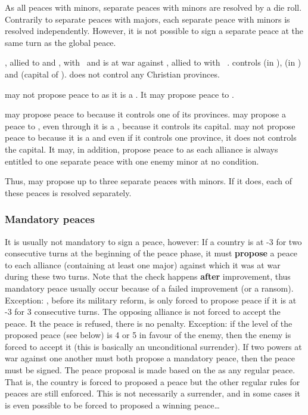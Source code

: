 \bparag As all peaces with minors, separate peaces with minors are resolved by
a die roll.
\bparag Contrarily to separate peaces with majors, each separate peace with
minors is resolved independently.
\bparag However, it is not possible to sign a separate peace at the same turn
as the global peace.

\begin{exemple}
  \TUR, allied to \paysMaroc and \paysTripoli, with \VASSAL\ \paysAlgerie and
  \paysTunisie is at war against \HIS, allied to \paysVenise with \VASSAL\
  \paysChevaliers. \HIS controls \provinceJebelTubqal (in \paysMaroc),
  \provinceOran (in \paysAlgerie) and \provinceIfriqiya (capital of
  \paysTunisie). \TUR does not control any Christian provinces.

  \TUR may not propose peace to \paysChevaliers as it is a \VASSAL. It may
  propose peace to \paysVenise.

  \HIS may propose peace to \paysMaroc because it controls one of its
  provinces. \HIS may propose a peace to \paysTunisie, even through it is a
  \VASSAL, because it controls its capital. \HIS may not propose peace to
  \paysAlgerie because it is a \VASSAL and even if it controls one province,
  it does not controls the capital. It may, in addition, propose peace to
  \paysTripoli as each alliance is always entitled to one separate peace with
  one enemy minor at no condition. 

  Thus, \HIS may propose up to three separate peaces with minors. If it does,
  each of these peaces is resolved separately.
\end{exemple}

\subsubsection{Mandatory peaces}\label{chPeace:Mandatory peaces}
 It is usually not mandatory to sign a
peace, however:
\bparag If a country is at -3 \STAB for two consecutive turns at the beginning
of the peace phase, it must \textbf{propose} a peace to each alliance
(containing at least one major) against which it was at war during these two
turns. Note that the check happens \textbf{after} \STAB improvement, thus
mandatory peace usually occur because of a failed improvement (or a ransom).
\bparag Exception: \RUS, before its military reform, is only forced to propose
peace if it is at -3 \STAB for 3 consecutive turns.
\bparag The opposing alliance is not forced to accept the peace. It the peace
is refused, there is no penalty.
\bparag Exception: if the level of the proposed peace (see below) is 4 or 5 in
favour of the enemy, then the enemy is forced to accept it (this is basically
an unconditional surrender).
\bparag If two powers at war against one another must both propose a mandatory
peace, then the peace must be signed.
\bparag The peace proposal is made based on the  as
any regular peace. That is, the country is forced to proposed a peace but the
other regular rules for peaces are still enforced. This is not necessarily a
surrender, and in some cases it is even possible to be forced to proposed a
winning peace\ldots

